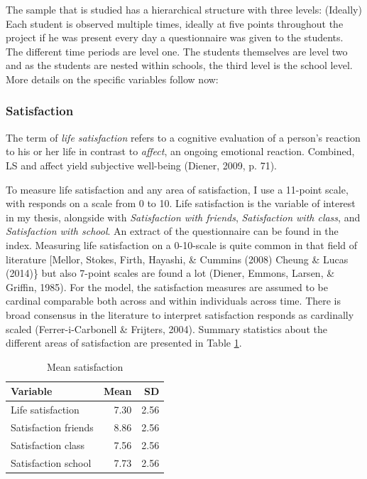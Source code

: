 \documentclass[a4, 12pt]{article}
\begin{document}
\label{sec:variables}
The sample that is studied has a hierarchical structure with three levels: (Ideally) Each student is observed multiple times, ideally at five points throughout the project if he was present every day a questionnaire was given to the students. The different time periods are level one. The students themselves are level two and as the students are nested within schools, the third level is the school level. More details on the specific variables follow now:

\hypertarget{satisfaction}{%
\subsubsection{Satisfaction}\label{satisfaction}}

The term of \emph{life satisfaction} refers to a cognitive evaluation of a person's reaction to his or her life in contrast to \emph{affect}, an ongoing emotional reaction. Combined, LS and affect yield subjective well-being (Diener, 2009, p. 71).

To measure life satisfaction and any area of satisfaction, I use a 11-point scale, with responds on a scale from 0 to 10. Life satisfaction is the variable of interest in my thesis, alongside with \emph{Satisfaction with friends}, \emph{Satisfaction with class}, and \emph{Satisfaction with school}. An extract of the questionnaire can be found in the index. Measuring life satisfaction on a 0-10-scale is quite common in that field of literature {[}Mellor, Stokes, Firth, Hayashi, \& Cummins (2008) Cheung \& Lucas (2014)\} but also 7-point scales are found a lot (Diener, Emmons, Larsen, \& Griffin, 1985). For the model, the satisfaction measures are assumed to be cardinal comparable both across and within individuals across time. There is broad consensus in the literature to interpret satisfaction responds as cardinally scaled (Ferrer-i-Carbonell \& Frijters, 2004). Summary statistics about the different areas of satisfaction are presented in Table \ref{tab:mean-LS}.

\begin{table}

\caption{\label{tab:mean-LS}Mean satisfaction}
\centering
\begin{tabular}[t]{lrr}
\toprule
Variable & Mean & SD\\
\midrule
Life satisfaction & 7.30 & 2.56\\
Satisfaction friends & 8.86 & 2.56\\
Satisfaction class & 7.56 & 2.56\\
Satisfaction school & 7.73 & 2.56\\
\bottomrule
\end{tabular}
\end{table}
\end{document}
